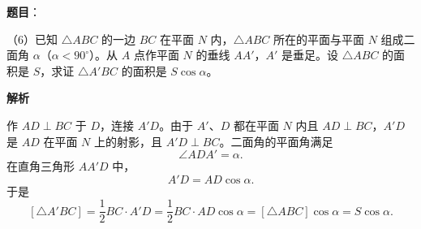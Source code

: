 \begin{answer}

\textbf{题目}：

（6）已知 $\triangle ABC$ 的一边 $BC$ 在平面 $N$ 内，$\triangle ABC$ 所在的平面与平面 $N$ 组成二面角 $\alpha$（$\alpha<90^\circ$）。从 $A$ 点作平面 $N$ 的垂线 $AA'$，$A'$ 是垂足。设 $\triangle ABC$ 的面积是 $S$，求证 $\triangle A'BC$ 的面积是 $S\cos\alpha$。

\textbf{解析}
\nopagebreak[4]
\begin{center}\end{center}
\nopagebreak[4]
作 $AD\perp BC$ 于 $D$，连接 $A'D$。由于 $A'$、$D$ 都在平面 $N$ 内且 $AD\perp BC$，$A'D$ 是 $AD$ 在平面 $N$ 上的射影，且 $A'D\perp BC$。二面角的平面角满足
\nopagebreak[4]
\[
\angle ADA'=\alpha.
\]
在直角三角形 $AA'D$ 中，
\nopagebreak[4]
\[
A'D=AD\cos\alpha.
\]
于是
\nopagebreak[4]
\[
[\triangle A'BC]=\frac12BC\cdot A'D
=\frac12BC\cdot AD\cos\alpha
=[\triangle ABC]\cos\alpha
=S\cos\alpha.
\]


\end{answer}

